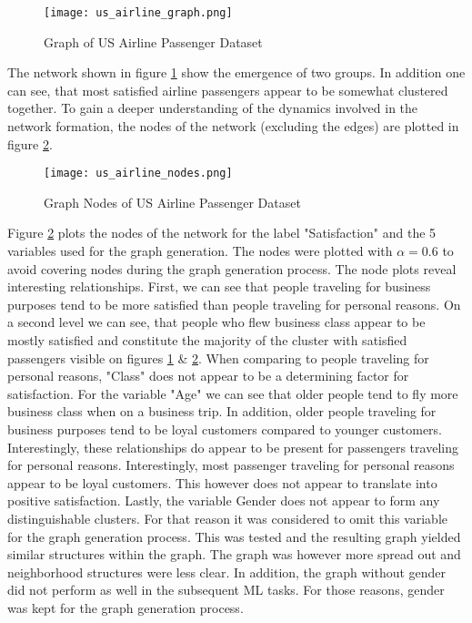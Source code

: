   \begin{figure}[h]
	  \centering
	  \texttt{[image: us\_airline\_graph.png]}
	  \caption{Graph of US Airline Passenger Dataset}
      \label{fig:us_airline_graph}
  \end{figure}
  
  \noindent The network shown in figure \ref{fig:us_airline_graph} show the
  emergence of two groups. In addition one can see, that most satisfied airline
  passengers appear to be somewhat clustered together. To gain a deeper
  understanding of the dynamics involved in the network formation, the nodes of
  the network (excluding the edges) are plotted in figure
  \ref{fig:us_airline_nodes}.

  \begin{figure}[h]
	  \centering
	  \texttt{[image: us\_airline\_nodes.png]}
	  \caption{Graph Nodes of US Airline Passenger Dataset}
      \label{fig:us_airline_nodes}
  \end{figure}

  \noindent Figure \ref{fig:us_airline_nodes} plots the nodes of the network
  for the label "Satisfaction" and the 5 variables used for the graph
  generation. The nodes were plotted with $\alpha = 0.6$ to avoid covering
  nodes during the graph generation process. The node plots reveal interesting
  relationships. First, we can see that people traveling for business purposes
  tend to be more satisfied than people traveling for personal reasons. On a
  second level we can see, that people who flew business class appear to be
  mostly satisfied and constitute the majority of the cluster with satisfied
  passengers visible on figures \ref{fig:us_airline_graph} \&
  \ref{fig:us_airline_nodes}. When comparing to people traveling for personal
  reasons, "Class" does not appear to be a determining factor for satisfaction.
  For the variable "Age" we can see that older people tend to fly more business
  class when on a business trip. In addition, older people traveling for
  business purposes tend to be loyal customers compared to younger customers.
  Interestingly, these relationships do appear to be present for passengers
  traveling for personal reasons. Interestingly, most passenger traveling for
  personal reasons appear to be loyal customers. This however does not appear
  to translate into positive satisfaction. Lastly, the variable Gender does not
  appear to form any distinguishable clusters. For that reason it was
  considered to omit this variable for the graph generation process. This was
  tested and the resulting graph yielded similar structures within the graph.
  The graph was however more spread out and neighborhood structures were less
  clear. In addition, the graph without gender did not perform as well in the
  subsequent ML tasks. For those reasons, gender was kept for the graph
  generation process. \\

